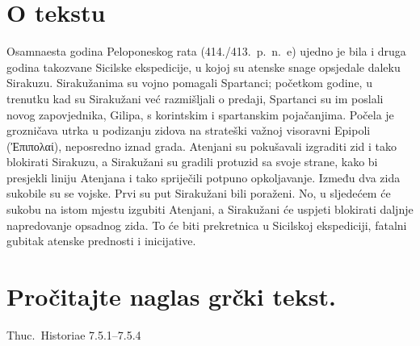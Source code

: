 


\section*{O tekstu}

Osamnaesta godina Peloponeskog rata (414./413.\ p.~n.~e) ujedno je bila i druga godina takozvane Sicilske ekspedicije, u kojoj su atenske snage opsjedale daleku Sirakuzu. Sirakužanima su vojno pomagali Spartanci; početkom godine, u trenutku kad su Sirakužani već razmišljali o predaji, Spartanci su im poslali novog zapovjednika, Gilipa, s korintskim i spartanskim pojačanjima. Počela je grozničava utrka u podizanju zidova na strateški važnoj visoravni Epipoli \textgreek[variant=ancient]{(Ἐπιπολαί),} neposredno iznad grada. Atenjani su pokušavali izgraditi zid i tako blokirati Sirakuzu, a Sirakužani su gradili protuzid sa svoje strane, kako bi presjekli liniju Atenjana i tako spriječili potpuno opkoljavanje. Između dva zida sukobile su se vojske. Prvi su put Sirakužani bili poraženi. No, u sljedećem će sukobu na istom mjestu izgubiti Atenjani, a Sirakužani će uspjeti blokirati daljnje napredovanje opsadnog zida. To će biti prekretnica u Sicilskoj ekspediciji, fatalni gubitak atenske prednosti i inicijative.

\newpage

\section*{Pročitajte naglas grčki tekst.}

Thuc.\ Historiae 7.5.1–7.5.4


\medskip


